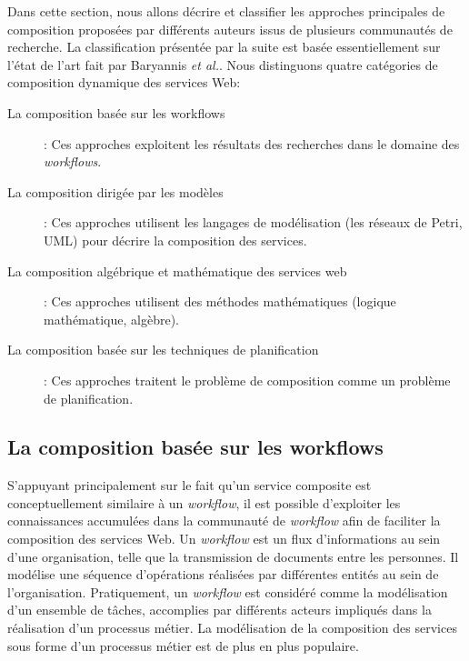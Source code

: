   Dans cette section, nous allons décrire et classifier les approches
  principales de composition proposées par différents auteurs issus
  de plusieurs communautés de recherche. La classification présentée
  par la suite est basée essentiellement sur l'état de l'art fait par
  Baryannis \emph{et al.}\cite{baryannis2010}.
  Nous distinguons quatre catégories de composition dynamique des services Web:

  \renewcommand{\descriptionlabel}[1]{\hspace{0.5cm}\textbullet~\textsf{#1}}
  \begin{description}
  \item[La composition basée sur les workflows]: Ces approches
    exploitent les résultats des recherches dans le domaine des
    \textit{workflows}.

  \item[La composition dirigée par les modèles]: Ces approches
    utilisent les langages de modélisation (les réseaux de Petri,
    \textsc{UML}) pour décrire la composition des services.

  \item[La composition algébrique et mathématique des services web]:
    Ces approches utilisent des méthodes mathématiques (logique
    mathématique, algèbre).

  \item[La composition basée sur les techniques de planification]: Ces
    approches traitent le problème de composition comme un problème de
    planification.
  \end{description}
  \enddescription

  \subsection{La composition  basée sur les workflows}
  \label{sec:les-approches-basees}
  S'appuyant principalement sur le fait qu'un service composite est
  conceptuellement similaire à un \textit{workflow}, il est possible
  d'exploiter les connaissances accumulées dans la communauté de
  \textit{workflow} afin de faciliter la composition des services
  Web. Un \textit{workflow} est un flux d'informations au sein d'une
  organisation, telle que la transmission de documents entre les
  personnes. Il modélise une séquence d'opérations réalisées par
  différentes entités au sein de l'organisation. Pratiquement, un
  \textit{workflow} est considéré comme la modélisation d'un ensemble
  de tâches, accomplies par différents acteurs impliqués dans la
  réalisation d'un processus métier. La modélisation de la composition
  des services sous forme d'un processus métier est de plus en plus
  populaire.\medskip

